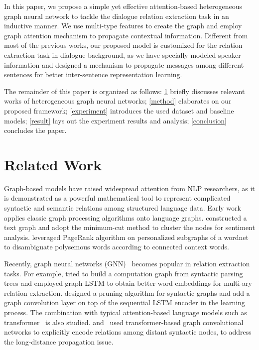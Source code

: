 \documentclass[11pt]{article}
\begin{document}
In this paper, we propose a simple yet effective attention-based heterogeneous graph neural network to tackle the dialogue relation extraction task in an inductive manner. We use multi-type features to create the graph and employ graph attention mechanism to propagate contextual information. Different from most of the previous works, our proposed model is customized for the relation extraction task in dialogue background, as we have specially modeled speaker information and designed a mechanism to propagate messages among different sentences for better inter-sentence representation learning.

The remainder of this paper is organized as follows: \cref{related-work} briefly discusses relevant works of heterogeneous graph neural networks; \cref{method} elaborates on our proposed framework; \cref{experiment} introduces the used dataset and baseline models; \cref{result} lays out the experiment results and analysis; \cref{conclusion} concludes the paper.

\section{Related Work}
\label{related-work}

Graph-based models have raised widespread attention from NLP researchers, as it is demonstrated as a powerful mathematical tool to represent complicated syntactic and semantic relations among structured language data.
Early work applies classic graph processing algorithms onto language graphs. \citet{pang2004sentimental} constructed a text graph and adopt the minimum-cut method to cluster the nodes for sentiment analysis. \citet{agirre2009personalizing} leveraged PageRank algorithm on personalized subgraphs of a wordnet to disambiguate polysemous words according to connected context words.

Recently, graph neural networks (GNN)~\cite{kipf2016semi} becomes popular in relation extraction tasks. For example, \citet{peng2017cross} tried to build a computation graph from syntactic parsing trees and employed graph LSTM to obtain better word embeddings for multi-ary relation extraction. \citet{zhang2018graph} designed a pruning algorithm for syntactic graphs and add a graph convolution layer on top of the sequential LSTM encoder in the learning process.
The combination with typical attention-based language models such as transformer~\cite{vaswani2017attention} is also studied.
\citet{cai2020graph} and~\citet{yao2020heterogeneous} used transformer-based graph convolutional networks to explicitly encode relations among distant syntactic nodes, to address the long-distance propagation issue.
\end{document}
